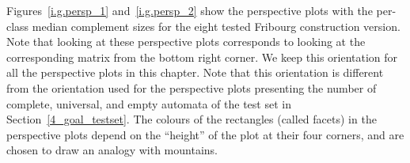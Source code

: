 Figures~\ref{i.g.persp_1} and~\ref{i.g.persp_2} show the perspective plots with the per-class median complement sizes for the eight tested Fribourg construction version. Note that looking at these perspective plots corresponds to looking at the corresponding matrix from the bottom right corner. We keep this orientation for all the perspective plots in this chapter. Note that this orientation is different from the orientation used for the perspective plots presenting the number of complete, universal, and empty automata of the \goal{} test set in Section~\ref{4_goal_testset}. The colours of the rectangles (called facets) in the perspective plots depend on the ``height'' of the plot at their four corners, and are chosen to draw an analogy with mountains.

\newcommand{\perspwidth}{0.475}

